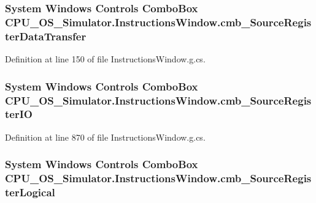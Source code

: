 \subsubsection[{cmb\+\_\+\+Source\+Register\+Data\+Transfer}]{\setlength{\rightskip}{0pt plus 5cm}System Windows Controls Combo\+Box C\+P\+U\+\_\+\+O\+S\+\_\+\+Simulator.\+Instructions\+Window.\+cmb\+\_\+\+Source\+Register\+Data\+Transfer\hspace{0.3cm}{\ttfamily [package]}}\label{class_c_p_u___o_s___simulator_1_1_instructions_window_ae2136d0a711f92a681278571fbe2868b}


Definition at line 150 of file Instructions\+Window.\+g.\+cs.

\hypertarget{class_c_p_u___o_s___simulator_1_1_instructions_window_a9f9d831a77d174675da89b1fe03602ad}{}
\subsubsection[{cmb\+\_\+\+Source\+Register\+I\+O}]{\setlength{\rightskip}{0pt plus 5cm}System Windows Controls Combo\+Box C\+P\+U\+\_\+\+O\+S\+\_\+\+Simulator.\+Instructions\+Window.\+cmb\+\_\+\+Source\+Register\+I\+O\hspace{0.3cm}{\ttfamily [package]}}\label{class_c_p_u___o_s___simulator_1_1_instructions_window_a9f9d831a77d174675da89b1fe03602ad}


Definition at line 870 of file Instructions\+Window.\+g.\+cs.

\hypertarget{class_c_p_u___o_s___simulator_1_1_instructions_window_a46a9647a5a6e661afb789b1faa95a15a}{}
\subsubsection[{cmb\+\_\+\+Source\+Register\+Logical}]{\setlength{\rightskip}{0pt plus 5cm}System Windows Controls Combo\+Box C\+P\+U\+\_\+\+O\+S\+\_\+\+Simulator.\+Instructions\+Window.\+cmb\+\_\+\+Source\+Register\+Logical\hspace{0.3cm}{\ttfamily [package]}}\label{class_c_p_u___o_s___simulator_1_1_instructions_window_a46a9647a5a6e661afb789b1faa95a15a}


